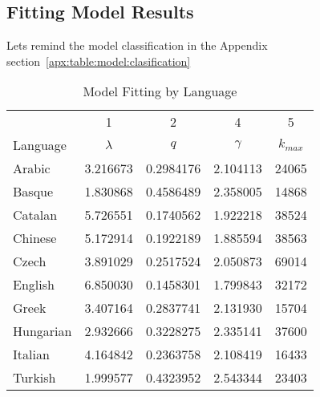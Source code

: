 \documentclass[12pt, a4paper]{article}
\begin{document}

\subsection{Fitting Model Results}
Lets remind the model classification in the Appendix section~\ref{apx:table:model:clasification}

\begin{table}[H]
\centering
    \begin{tabular}{l c c c c}
             & 1 & 2 & 4 & 5\\
    Language & $\lambda$ & $q$ & $\gamma$ & $k_{max}$\\
     \hline
     Arabic    & 3.216673 & 0.2984176 & 2.104113 & 24065 \\
     Basque    & 1.830868 & 0.4586489 & 2.358005 & 14868 \\
     Catalan   & 5.726551 & 0.1740562 & 1.922218 & 38524 \\
     Chinese   & 5.172914 & 0.1922189 & 1.885594 & 38563 \\
     Czech     & 3.891029 & 0.2517524 & 2.050873 & 69014 \\
     English   & 6.850030 & 0.1458301 & 1.799843 & 32172 \\
     Greek     & 3.407164 & 0.2837741 & 2.131930 & 15704 \\
     Hungarian & 2.932666 & 0.3228275 & 2.335141 & 37600 \\
     Italian   & 4.164842 & 0.2363758 & 2.108419 & 16433 \\
     Turkish   & 1.999577 & 0.4323952 & 2.543344 & 23403 
    \end{tabular}
   \caption{Model Fitting by Language}
   \label{table:3}
\end{table}
\end{document}
